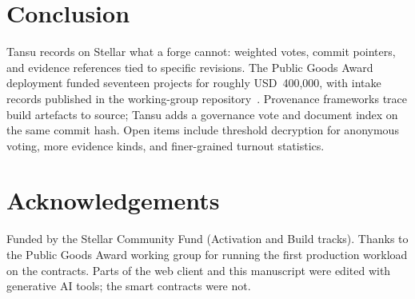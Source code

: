 \documentclass[11pt]{article}
\newcommand{\tansu}{Tansu}
\begin{document}
\section{Conclusion}
\label{sec:conclusion}

\tansu{} records on Stellar what a forge cannot: weighted votes, commit
pointers, and evidence references tied to specific revisions. The Public Goods
Award deployment funded seventeen projects for roughly USD~400{,}000, with
intake records published in the working-group
repository~\citep{pg_award_intake}. Provenance frameworks trace build
artefacts to source; \tansu{} adds a governance vote and document index on the
same commit hash. Open items include threshold decryption for anonymous
voting, more evidence kinds, and finer-grained turnout statistics.

\section*{Acknowledgements}

Funded by the Stellar Community Fund (Activation and Build tracks). Thanks to
the Public Goods Award working group for running the first production
workload on the contracts. Parts of the web client and this manuscript were
edited with generative AI tools; the smart contracts were not.



\end{document}
